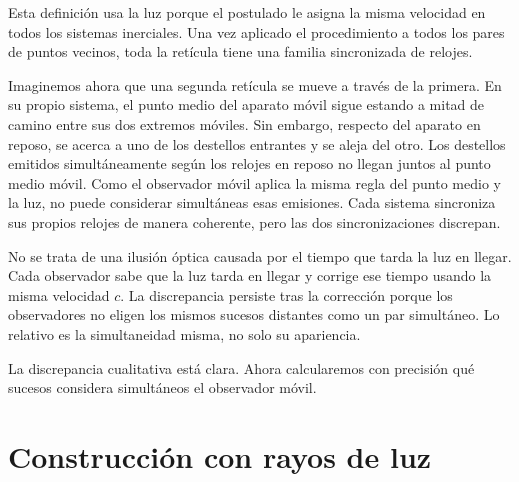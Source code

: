 Esta definición usa la luz porque el postulado le asigna la misma velocidad en todos los sistemas inerciales. Una vez aplicado el procedimiento a todos los pares de puntos vecinos, toda la retícula tiene una familia sincronizada de relojes.

Imaginemos ahora que una segunda retícula se mueve a través de la primera. En su propio sistema, el punto medio del aparato móvil sigue estando a mitad de camino entre sus dos extremos móviles. Sin embargo, respecto del aparato en reposo, se acerca a uno de los destellos entrantes y se aleja del otro. Los destellos emitidos simultáneamente según los relojes en reposo no llegan juntos al punto medio móvil. Como el observador móvil aplica la misma regla del punto medio y la luz, no puede considerar simultáneas esas emisiones. Cada sistema sincroniza sus propios relojes de manera coherente, pero las dos sincronizaciones discrepan.

No se trata de una ilusión óptica causada por el tiempo que tarda la luz en llegar. Cada observador sabe que la luz tarda en llegar y corrige ese tiempo usando la misma velocidad \(c\). La discrepancia persiste tras la corrección porque los observadores no eligen los mismos sucesos distantes como un par simultáneo. Lo relativo es la simultaneidad misma, no solo su apariencia.

\begin{classroomqa}\end{classroomqa}

La discrepancia cualitativa está clara. Ahora calcularemos con precisión qué sucesos considera simultáneos el observador móvil.

\section{Construcción con rayos de luz}

